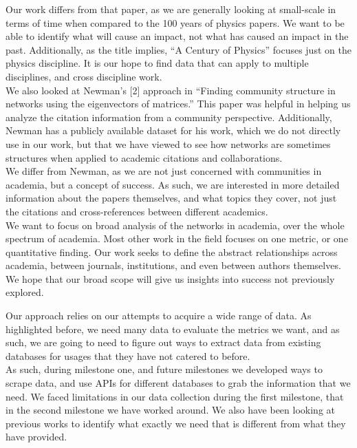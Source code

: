 \documentclass[times, 10pt,twocolumn]{article}
\begin{document}
Our work differs from that paper, as we are generally looking at small-scale in terms of time when compared to the 100 years of physics papers. We want to be able to identify what will cause an impact, not what has caused an impact in the past. Additionally, as the title implies, “A Century of Physics” focuses just on the physics discipline. It is our hope to find data that can apply to multiple disciplines, and cross discipline work. \\

We also looked at Newman’s [2] approach in “Finding community structure in networks using the eigenvectors of matrices.” This paper was helpful in helping us analyze the citation information from a community perspective. Additionally, Newman has a publicly available dataset for his work, which we do not directly use in our work, but that we have viewed to see how networks are sometimes structures when applied to academic citations and collaborations.\\

We differ from Newman, as we are not just concerned with communities in academia, but a concept of success. As such, we are interested in more detailed information about the papers themselves, and what topics they cover, not just the citations and cross-references between different academics. \\

We want to focus on broad analysis of the networks in academia, over the whole spectrum of academia. Most other work in the field focuses on one metric, or one quantitative finding. Our work seeks to define the abstract relationships across academia, between journals, institutions, and even between authors themselves. We hope that our broad scope will give us insights into success not previously explored.

Our approach relies on our attempts to acquire a wide range of data. As highlighted before, we need many data to evaluate the metrics we want, and as such, we are going to need to figure out ways to extract data from existing databases for usages that they have not catered to before.\\

As such, during milestone one, and future milestones we developed ways to scrape data, and use APIs for different databases to grab the information that we need. We faced limitations in our data collection during the first milestone, that in the second milestone we have worked around. We also have been looking at previous works to identify what exactly we need that is different from what they have provided. \\
\end{document}
